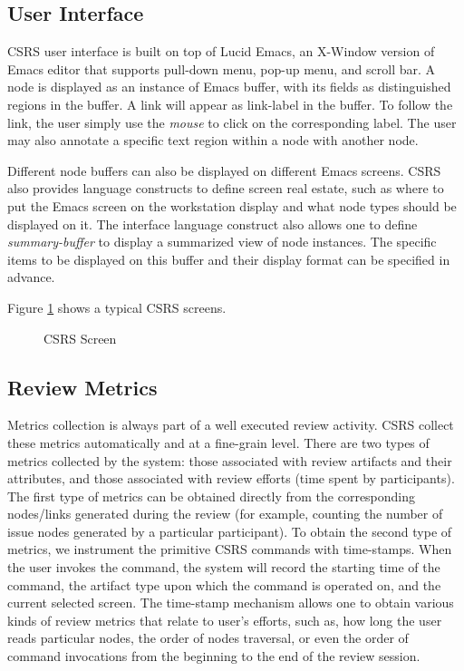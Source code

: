 \subsection{User Interface}

CSRS user interface is built on top of Lucid Emacs, an X-Window
version of Emacs editor that supports pull-down menu, pop-up menu, and
scroll bar. A node is displayed as an instance of Emacs
buffer, with its fields as distinguished regions in the buffer. A link
will appear as link-label in the buffer. To follow the link, the user
simply use the {\it mouse} to click on the corresponding label. The
user may also annotate a 
specific text region within a node with another node.

Different node buffers can also be displayed on different Emacs screens. 
CSRS also provides language constructs to define screen real estate,
such as where to put the Emacs screen on the workstation display and
what node types should be displayed on it.
The interface language construct also allows one to define
{\it summary-buffer} to display a summarized view of node instances. 
The specific items to be displayed on this buffer and their display
format can be specified in advance. 

Figure \ref{fig:csrs-screen} shows a typical CSRS screens.

\begin{figure}[h]
  \begin{center}
  \end{center}
  \caption{CSRS Screen}
  \label{fig:csrs-screen}
\end{figure}

\subsection{Review Metrics}
Metrics collection is always part of a well executed review activity.
CSRS collect these metrics automatically and at a
fine-grain level. There are two types of metrics collected by
the system: those associated with review artifacts and their
attributes, and those associated with review efforts (time spent by
participants).  The first type of metrics can be obtained directly
from the corresponding nodes/links generated during the review
(for example, counting the number of issue nodes generated by a
particular participant). To obtain the second type of metrics, we
instrument the primitive CSRS commands with time-stamps. When the user
invokes the command, the system will record the starting time of the
command, the artifact type upon which the command is operated on, and the
current selected screen. 
The time-stamp mechanism allows one to obtain various kinds of
review metrics that relate to user's efforts, such as, how long the
user reads particular nodes, the order of nodes traversal,
or even the order of command invocations from the beginning to
the end of the review session.

